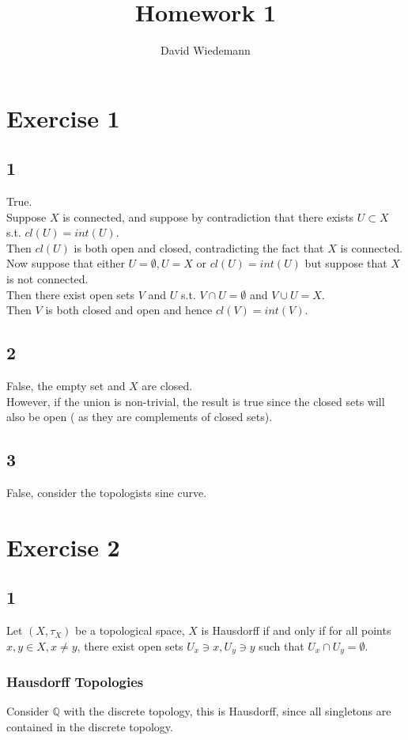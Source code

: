 \documentclass[11pt, a4paper]{article}
\begin{document}
\title{Homework 1}
\author{David Wiedemann}
\maketitle
\section*{Exercise 1}
\subsection*{1}
True.\\
Suppose $X$ is connected, and suppose by contradiction that there exists $U \subset X$ s.t. $ cl( U) =int( U) $.\\
Then $ cl( U) $ is both open and closed, contradicting the fact that $X$ is connected.\\
Now suppose that either $U= \emptyset, U=X$ or $ cl( U) = int( U) $ but suppose that $X$ is not connected.\\
Then there exist open sets $V$ and $U$ s.t. $V\cap U = \emptyset$ and $V \cup U= X$.\\
Then $V$ is both closed and open and hence $cl( V)= int( V) $.\\
\subsection*{2}
False, the empty set and $X$ are closed.\\
However, if the union is non-trivial, the result is true since the closed sets will also be open ( as they are complements of closed sets).\\
\subsection*{3}
False, consider the topologists sine curve.
\section*{Exercise 2}
\subsection*{1}
Let $( X,\tau_X) $ be a topological space, $X$ is Hausdorff if and only if for all points $x, y \in X,x\neq y$, there exist open sets $U_x \ni x, U_y \ni y$ such that $U_x\cap U_y= \emptyset.$\\

\subsubsection*{Hausdorff Topologies}
Consider $\mathbb{Q}$ with the discrete topology, this is Hausdorff, since all singletons are contained in the discrete topology.\\
\end{document}
